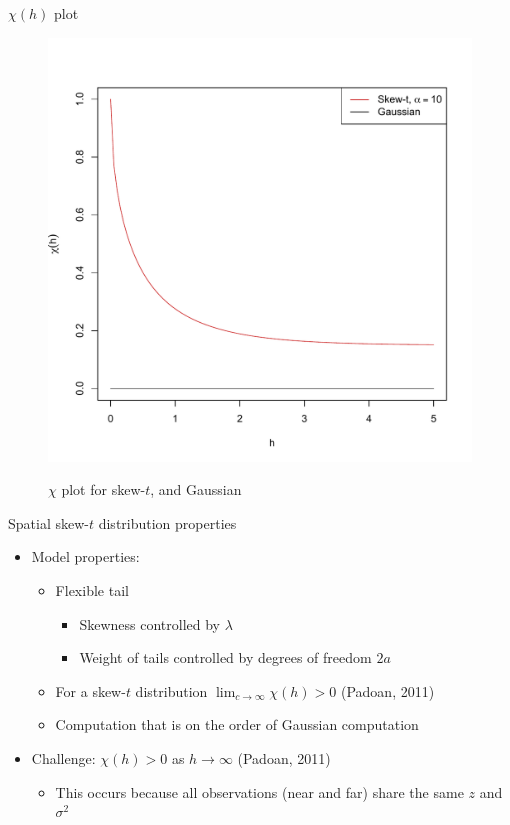 \documentclass{beamer}
\begin{document}
\begin{frame}{$\chi(h)$ plot}
  \vspace{-2em}
  \centering
  \begin{figure}
  \includegraphics[width=.65\linewidth]{./plots/pot/chi-h-t_and_gaus.pdf}\\[-0.2in]
  \caption{$\chi$ plot for skew-$t$, and Gaussian}
  \end{figure}
\end{frame}

\begin{frame}{Spatial skew-$t$ distribution properties}
  \begin{itemize} \setlength{\itemsep}{1em}
    \item Model properties:
    \begin{itemize}
      \item Flexible tail
      \begin{itemize}
        \item Skewness controlled by $\lambda$
        \item Weight of tails controlled by degrees of freedom $2a$
      \end{itemize}
      \item For a skew-$t$ distribution $\lim_{c \rightarrow \infty} \chi(h) > 0$ (Padoan, 2011)
      \item Computation that is on the order of Gaussian computation
    \end{itemize}
    \item Challenge: $\chi(h) > 0$ as $h \rightarrow \infty$ (Padoan, 2011)
    \begin{itemize}
      \item This occurs because all observations (near and far) share the same $z$ and $\sigma^2$
    \end{itemize}
  \end{itemize}
\end{frame}
\end{document}
